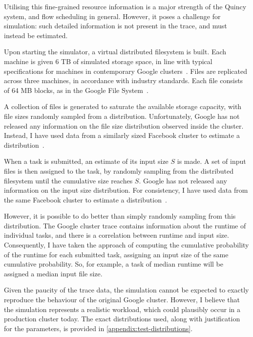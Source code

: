 Utilising this fine-grained resource information is a major strength of the Quincy system, and flow scheduling in general. However, it poses a challenge for simulation: such detailed information is not present in the trace, and must instead be estimated. 

Upon starting the simulator, a virtual distributed filesystem is built. Each machine is given 6 TB of simulated storage space, in line with typical specifications for machines in contemporary Google clusters~\cite{Fikes:2010}. Files are replicated across three machines, in accordance with industry standards\footnotemark. Each file consists of 64 MB blocks, as in the Google File System~\cite{Ghemawat:2003}.

A collection of files is generated to saturate the available storage capacity\footnotemark, with file sizes randomly sampled from a distribution. Unfortunately, Google has not released any information on the file size distribution observed inside the cluster. Instead, I have used data from a similarly sized Facebook cluster to estimate a distribution~\cite{Chen:2012}.

When a task is submitted, an estimate of its input size $S$ is made. A set of input files is then assigned to the task, by randomly sampling from the distributed filesystem until the cumulative size reaches $S$. Google has not released any information on the input size distribution. For consistency, I have used data from the same Facebook cluster to estimate a distribution~\cite{Chen:2012}.

However, it is possible to do better than simply randomly sampling from this distribution. The Google cluster trace contains information about the runtime of individual tasks, and there is a correlation between runtime and input size. Consequently, I have taken the approach of computing the cumulative probability of the runtime for each submitted task, assigning an input size of the same cumulative probability. So, for example, a task of median runtime will be assigned a median input file size.

Given the paucity of the trace data, the simulation cannot be expected to exactly reproduce the behaviour of the original Google cluster. However, I believe that the simulation represents a realistic workload, which could plausibly occur in a production cluster today. The exact distributions used, along with justification for the parameters, is provided in \cref{appendix:test-distributions}.


